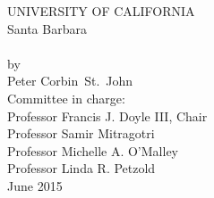 \thispagestyle{empty}
\begin{center}
  UNIVERSITY OF CALIFORNIA\\
  Santa Barbara\\
  \vfil
  {\Large\thetitle}\\
  \vfil
  by\\
  \vfil
  {\large Peter Corbin\ St.\ John}\\
  \vfil
  Committee in charge:\\
  Professor Francis J. Doyle III, Chair\\
  Professor Samir Mitragotri\\
  Professor Michelle A. O'Malley\\
  Professor Linda R. Petzold\\
  \vfil
  June 2015
\end{center}
